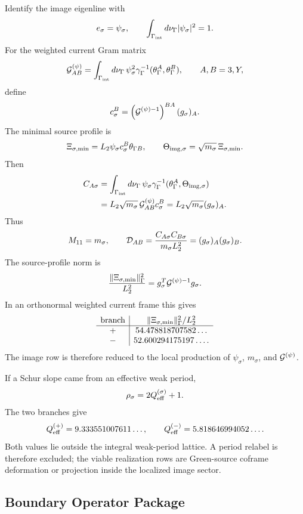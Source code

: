 \documentclass[11pt]{article}
\theoremstyle{definition}
\theoremstyle{remark}
\begin{document}
Identify the image eigenline with
\[
  e_\sigma=\psi_\sigma,
  \qquad
  \int_{\Gamma_{\rm int}}d\nu_\Gamma|\psi_\sigma|^2=1 .
\]
For the weighted current Gram matrix
\[
  {\cal G}_{AB}^{(\psi)}
  =
  \int_{\Gamma_{\rm int}}d\nu_\Gamma\,
  \psi_\sigma^2
  \gamma_\Gamma^{-1}(\theta_\Gamma^A,\theta_\Gamma^B),
  \qquad A,B=3,Y ,
\]
define
\[
  c_\sigma^B
  =
  \left({\cal G}^{(\psi)-1}\right)^{BA}(g_\sigma)_A .
\]
The minimal source profile is
\[
  \Xi_{\sigma,\min}
  =
  L_2\psi_\sigma c_\sigma^B\theta_{\Gamma B},
  \qquad
  \Theta_{{\rm img},\sigma}
  =
  \sqrt{m_\sigma}\,\Xi_{\sigma,\min}.
\]
Then
\[
\begin{aligned}
  C_{A\sigma}
  &=
  \int_{\Gamma_{\rm int}}d\nu_\Gamma\,
  \psi_\sigma
  \gamma_\Gamma^{-1}
  (\theta_\Gamma^A,\Theta_{{\rm img},\sigma})\\
  &=
  L_2\sqrt{m_\sigma}\,
  {\cal G}_{AB}^{(\psi)}c_\sigma^B
  =
  L_2\sqrt{m_\sigma}(g_\sigma)_A .
\end{aligned}
\]
Thus
\[
  M_{11}=m_\sigma,
  \qquad
  {\cal D}_{AB}
  =
  \frac{C_{A\sigma}C_{B\sigma}}{m_\sigma L_2^2}
  =
  (g_\sigma)_A(g_\sigma)_B .
\]
The source-profile norm is
\[
  \frac{\|\Xi_{\sigma,\min}\|_\Gamma^2}{L_2^2}
  =
  g_\sigma^T{\cal G}^{(\psi)-1}g_\sigma .
\]
In an orthonormal weighted current frame this gives
\[
\begin{array}{c|c}
{\rm branch}&\|\Xi_{\sigma,\min}\|_\Gamma^2/L_2^2\\ \hline
+&54.478818707582\ldots\\
-&52.600294175197\ldots .
\end{array}
\]
The image row is therefore reduced to the local production of
\(\psi_\sigma\), \(m_\sigma\), and \({\cal G}^{(\psi)}\).

If a Schur slope came from an effective weak period,
\[
  \rho_\sigma=2Q_{\rm eff}^{(\sigma)}+1 .
\]
The two branches give
\[
  Q_{\rm eff}^{(+)}
  =
  9.333551007611\ldots,
  \qquad
  Q_{\rm eff}^{(-)}
  =
  5.818646994052\ldots .
\]
Both values lie outside the integral weak-period lattice.  A period relabel is
therefore excluded; the viable realization rows are Green-source coframe
deformation or projection inside the localized image sector.

\subsection{Boundary Operator Package}
\end{document}
